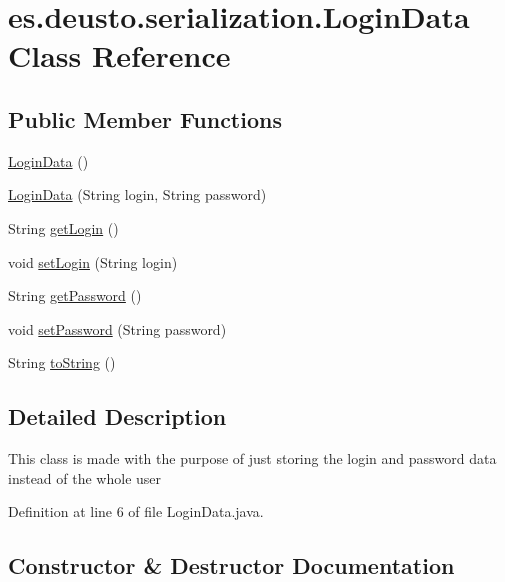 \hypertarget{classes_1_1deusto_1_1serialization_1_1_login_data}{}\section{es.\+deusto.\+serialization.\+Login\+Data Class Reference}
\label{classes_1_1deusto_1_1serialization_1_1_login_data}
\subsection*{Public Member Functions}
\begin{DoxyCompactItemize}
\item 
\hyperlink{classes_1_1deusto_1_1serialization_1_1_login_data_adc1378ad932252951d270fb5c265b2a0}{Login\+Data} ()
\item 
\hyperlink{classes_1_1deusto_1_1serialization_1_1_login_data_a38ab50660ffb0b1283f825c463b94dd4}{Login\+Data} (String login, String password)
\item 
String \hyperlink{classes_1_1deusto_1_1serialization_1_1_login_data_a0e32fb64e6a069ddf5471b0ad9469e18}{get\+Login} ()
\item 
void \hyperlink{classes_1_1deusto_1_1serialization_1_1_login_data_affe30ee001271b2264106eeecc302882}{set\+Login} (String login)
\item 
String \hyperlink{classes_1_1deusto_1_1serialization_1_1_login_data_a39504f63e22c01e184427621c9b7cb12}{get\+Password} ()
\item 
void \hyperlink{classes_1_1deusto_1_1serialization_1_1_login_data_a8a744db82f9ddad859e04b6069502409}{set\+Password} (String password)
\item 
String \hyperlink{classes_1_1deusto_1_1serialization_1_1_login_data_a638424167a2321d58645b31fe9aef420}{to\+String} ()
\end{DoxyCompactItemize}


\subsection{Detailed Description}
This class is made with the purpose of just storing the login and password data instead of the whole user 

Definition at line 6 of file Login\+Data.\+java.



\subsection{Constructor \& Destructor Documentation}
\mbox{\label{classes_1_1deusto_1_1serialization_1_1_login_data_adc1378ad932252951d270fb5c265b2a0}} 
